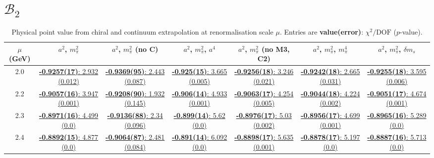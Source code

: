 \documentclass[12pt]{extarticle}
\begin{document}
\section{$\mathcal{B}_2$}
\begin{table}[h!]
\begin{center}
\begin{tabular}{|c|c|c|c|c|c|c|}
\hline
$\mu$ (GeV) & $a^2$, $m_\pi^2$& $a^2$, $m_\pi^2$ (no C)& $a^2$, $m_\pi^2$, $a^4$& $a^2$, $m_\pi^2$ (no M3, C2)& $a^2$, $m_\pi^2$, $m_\pi^4$& $a^2$, $m_\pi^2$, $\delta m_s$\\
\hline
2.0& \hyperlink{VVmAA/SUSY/bag_a2m2_20.pdf.1}{\textbf{-0.9257(17)}: 2.932 (0.012)} & \hyperlink{VVmAA/SUSY/bag_a2m2noC_20.pdf.1}{\textbf{-0.9369(95)}: 2.443 (0.087)} & \hyperlink{VVmAA/SUSY/bag_a2a4m2_20.pdf.1}{\textbf{-0.925(15)}: 3.665 (0.005)} & \hyperlink{VVmAA/SUSY/bag_a2m2mcut_20.pdf.1}{\textbf{-0.9256(18)}: 3.246 (0.021)} & \hyperlink{VVmAA/SUSY/bag_a2m2m4_20.pdf.1}{\textbf{-0.9242(18)}: 2.665 (0.031)} & \hyperlink{VVmAA/SUSY/bag_a2m2delm_20.pdf.1}{\textbf{-0.9255(18)}: 3.595 (0.006)}\\
2.2& \hyperlink{VVmAA/SUSY/bag_a2m2_22.pdf.1}{\textbf{-0.9057(16)}: 3.947 (0.001)} & \hyperlink{VVmAA/SUSY/bag_a2m2noC_22.pdf.1}{\textbf{-0.9208(90)}: 1.932 (0.145)} & \hyperlink{VVmAA/SUSY/bag_a2a4m2_22.pdf.1}{\textbf{-0.906(14)}: 4.933 (0.001)} & \hyperlink{VVmAA/SUSY/bag_a2m2mcut_22.pdf.1}{\textbf{-0.9063(17)}: 4.254 (0.005)} & \hyperlink{VVmAA/SUSY/bag_a2m2m4_22.pdf.1}{\textbf{-0.9044(18)}: 4.224 (0.002)} & \hyperlink{VVmAA/SUSY/bag_a2m2delm_22.pdf.1}{\textbf{-0.9051(17)}: 4.674 (0.001)}\\
2.3& \hyperlink{VVmAA/SUSY/bag_a2m2_23.pdf.1}{\textbf{-0.8971(16)}: 4.499 (0.0)} & \hyperlink{VVmAA/SUSY/bag_a2m2noC_23.pdf.1}{\textbf{-0.9136(88)}: 2.34 (0.096)} & \hyperlink{VVmAA/SUSY/bag_a2a4m2_23.pdf.1}{\textbf{-0.899(14)}: 5.62 (0.0)} & \hyperlink{VVmAA/SUSY/bag_a2m2mcut_23.pdf.1}{\textbf{-0.8976(17)}: 5.03 (0.002)} & \hyperlink{VVmAA/SUSY/bag_a2m2m4_23.pdf.1}{\textbf{-0.8956(17)}: 4.699 (0.001)} & \hyperlink{VVmAA/SUSY/bag_a2m2delm_23.pdf.1}{\textbf{-0.8965(16)}: 5.289 (0.0)}\\
2.4& \hyperlink{VVmAA/SUSY/bag_a2m2_24.pdf.1}{\textbf{-0.8892(15)}: 4.877 (0.0)} & \hyperlink{VVmAA/SUSY/bag_a2m2noC_24.pdf.1}{\textbf{-0.9064(87)}: 2.481 (0.084)} & \hyperlink{VVmAA/SUSY/bag_a2a4m2_24.pdf.1}{\textbf{-0.891(14)}: 6.092 (0.0)} & \hyperlink{VVmAA/SUSY/bag_a2m2mcut_24.pdf.1}{\textbf{-0.8898(17)}: 5.635 (0.001)} & \hyperlink{VVmAA/SUSY/bag_a2m2m4_24.pdf.1}{\textbf{-0.8878(17)}: 5.197 (0.0)} & \hyperlink{VVmAA/SUSY/bag_a2m2delm_24.pdf.1}{\textbf{-0.8887(16)}: 5.713 (0.0)}\\
\hline
\end{tabular}
\caption{Physical point value from chiral and continuum extrapolation at renormalisation scale $\mu$. Entries are \textbf{value(error)}: $\chi^2/\text{DOF}$ ($p$-value).}
\end{center}
\end{table}
\end{document}
